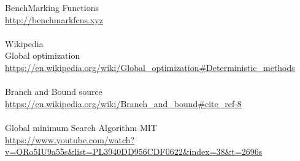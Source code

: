\documentclass{article}
\begin{document}
\begin{thebibliography}

BenchMarking Functions\\
\url{http://benchmarkfcns.xyz}\\\\

Wikipedia\\Global optimization\\
\url{https://en.wikipedia.org/wiki/Global_optimization#Deterministic_methods}\\\\

Branch and Bound source\\
\url{https://en.wikipedia.org/wiki/Branch_and_bound#cite_ref-8}\\\\

Global minimum Search Algorithm MIT\\
\url{https://www.youtube.com/watch?v=ORo5IU9a55s&list=PL3940DD956CDF0622&index=38&t=2696s}\\\\

\end{thebibliography}  
\end{document}
